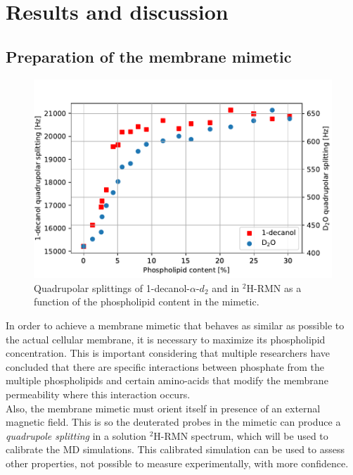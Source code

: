 \documentclass[3p,preprint,review]{elsarticle}
\begin{document}
	\section{Results and discussion}
	
	\subsection{Preparation of the membrane mimetic}
	
	\begin{figure}[h]
		\centering
		\includegraphics[width=\columnwidth]{splitting_v_phospholipid}
		\caption{Quadrupolar splittings of 1-decanol-$\alpha$-$d_2$ and  in
			$^2$H-RMN as a function of the phospholipid content in the mimetic.}
		\label{fig:1st_max}
	\end{figure}
	
	In order to achieve a membrane mimetic that behaves as similar as possible to
	the actual cellular membrane, it is necessary to maximize its phospholipid
	concentration. This is important considering that multiple researchers have
	concluded that there are specific interactions between phosphate from the
	multiple phospholipids and certain amino-acids that modify the membrane
	permeability where this interaction occurs\cite{Aliaga2011,Hristova2011}.\\
	Also, the membrane mimetic must orient itself in presence of an external
	magnetic field. This is so the deuterated probes in the mimetic can produce a
	\textit{quadrupole splitting} in a solution $^2$H-RMN spectrum, which will be
	used to calibrate the MD simulations. This calibrated simulation can be used to
	assess other properties, not possible to measure experimentally, with more
	confidence.\\
	
\end{document}
